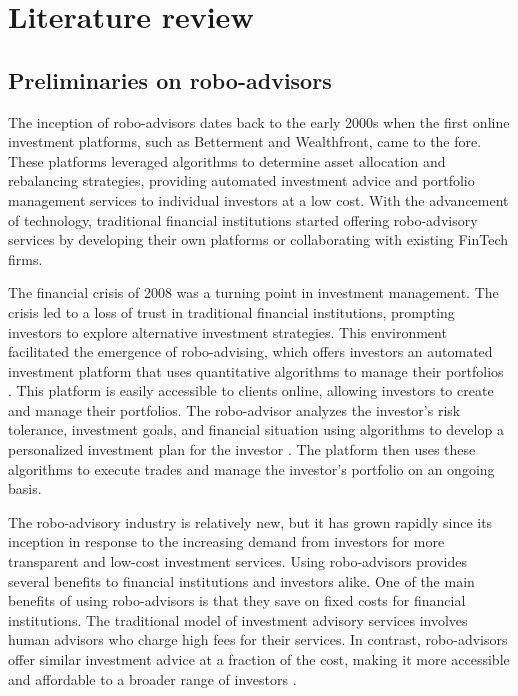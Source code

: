 \chapter{Literature review}
\section{Preliminaries on robo-advisors}

The inception of robo-advisors dates back to the early 2000s when the first online investment platforms, such as Betterment and Wealthfront, came to the fore. These platforms leveraged algorithms to determine asset allocation and rebalancing strategies, providing automated investment advice and portfolio management services to individual investors at a low cost. With the advancement of technology, traditional financial institutions started offering robo-advisory services by developing their own platforms or collaborating with existing FinTech firms.

The financial crisis of 2008 was a turning point in investment management. The crisis led to a loss of trust in traditional financial institutions, prompting investors to explore alternative investment strategies. This environment facilitated the emergence of robo-advising, which offers investors an automated investment platform that uses quantitative algorithms to manage their portfolios \cite{capponi2022personalized}. This platform is easily accessible to clients online, allowing investors to create and manage their portfolios. The robo-advisor analyzes the investor's risk tolerance, investment goals, and financial situation using algorithms to develop a personalized investment plan for the investor \cite{beketov2018robo}. The platform then uses these algorithms to execute trades and manage the investor's portfolio on an ongoing basis.

The robo-advisory industry is relatively new, but it has grown rapidly since its inception in response to the increasing demand from investors for more transparent and low-cost investment services. Using robo-advisors provides several benefits to financial institutions and investors alike. One of the main benefits of using robo-advisors is that they save on fixed costs for financial institutions. The traditional model of investment advisory services involves human advisors who charge high fees for their services. In contrast, robo-advisors offer similar investment advice at a fraction of the cost, making it more accessible and affordable to a broader range of investors \cite{beketov2018robo}.

